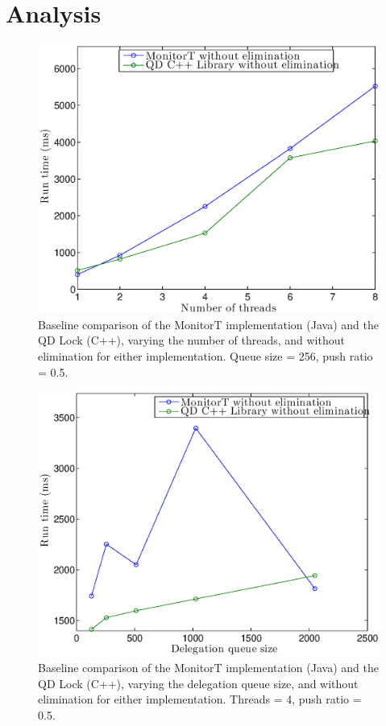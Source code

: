 \section{Analysis}

\begin{figure}[]
\centering
\includegraphics[width=.75\textwidth]{figs/00_TimeVsThreads_cppNoElim_javaNoElim.eps}
\caption[]{Baseline comparison of the MonitorT implementation (Java) and the QD Lock (C++), varying the number of threads, and without elimination for either implementation. Queue size = 256, push ratio = 0.5.}
\label{fig:fig00}
\end{figure}

\begin{figure}[]
\centering
\includegraphics[width=.75\textwidth]{figs/01_TimeVsQDsize_cppNoElim_javaNoElim.eps}
\caption[]{Baseline comparison of the MonitorT implementation (Java) and the QD Lock (C++), varying the delegation queue size, and without elimination for either implementation. Threads = 4, push ratio = 0.5.}
\label{fig:fig01}
\end{figure}

